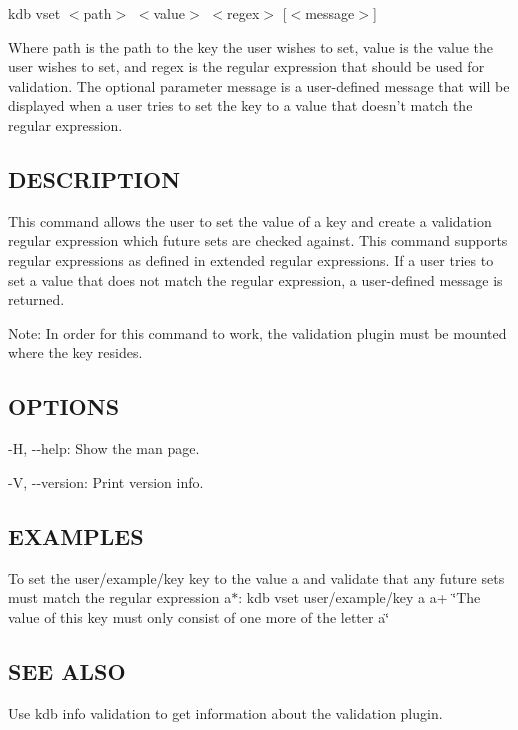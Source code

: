 {\ttfamily kdb vset $<$path$>$ $<$value$>$ $<$regex$>$ \mbox{[}$<$message$>$\mbox{]}}

Where {\ttfamily path} is the path to the key the user wishes to set, {\ttfamily value} is the value the user wishes to set, and {\ttfamily regex} is the regular expression that should be used for validation. The optional parameter {\ttfamily message} is a user-\/defined message that will be displayed when a user tries to set the key to a value that doesn't match the regular expression.

\subsection*{D\+E\+S\+C\+R\+I\+P\+T\+I\+O\+N}

This command allows the user to set the value of a key and create a validation regular expression which future sets are checked against. This command supports regular expressions as defined in extended regular expressions. If a user tries to set a value that does not match the regular expression, a user-\/defined message is returned.

Note\+: In order for this command to work, the {\ttfamily validation} plugin must be mounted where the key resides.

\subsection*{O\+P\+T\+I\+O\+N\+S}


\begin{DoxyItemize}
\item {\ttfamily -\/\+H}, {\ttfamily -\/-\/help}\+: Show the man page.
\item {\ttfamily -\/\+V}, {\ttfamily -\/-\/version}\+: Print version info.
\end{DoxyItemize}

\subsection*{E\+X\+A\+M\+P\+L\+E\+S}

To set the {\ttfamily user/example/key} key to the value {\ttfamily a} and validate that any future sets must match the regular expression {\ttfamily a$\ast$}\+: {\ttfamily kdb vset user/example/key a a+ \char`\"{}\+The value of this key must only consist of one more of the letter a\char`\"{}}

\subsection*{S\+E\+E A\+L\+S\+O}


\begin{DoxyItemize}
\item Use {\ttfamily kdb info validation} to get information about the validation plugin. 
\end{DoxyItemize}